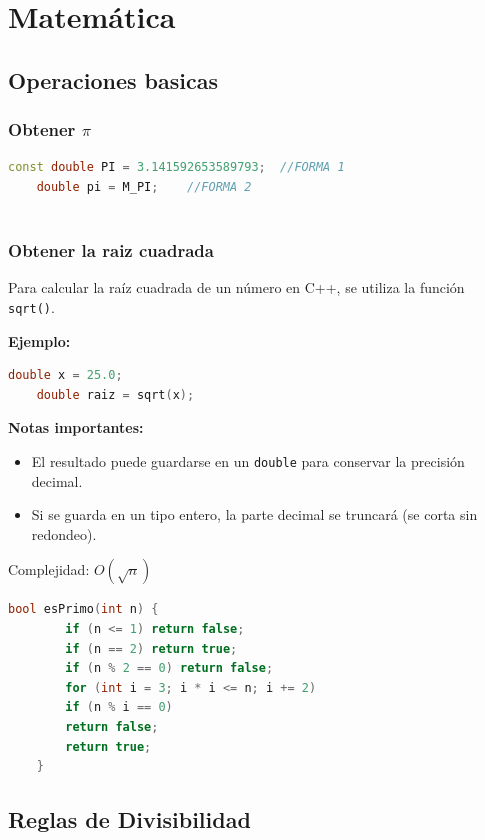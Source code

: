 \chapter{Matemática}

\section{Operaciones basicas}

\subsection{Obtener $\pi$}
\begin{lstlisting}[language=C++, caption={Obtener $\pi$}]
	const double PI = 3.141592653589793;  //FORMA 1
	double pi = M_PI; 	 //FORMA 2
	
\end{lstlisting}

\subsection{Obtener la raiz cuadrada}
Para calcular la raíz cuadrada de un número en C++, se utiliza la función \texttt{sqrt()}.

\bigskip

\textbf{Ejemplo:}

\begin{lstlisting}[language=C++]
	double x = 25.0;
	double raiz = sqrt(x);
\end{lstlisting}

\bigskip

\textbf{Notas importantes:}
\begin{itemize}
	\item El resultado puede guardarse en un \texttt{double} para conservar la precisión decimal.
	\item Si se guarda en un tipo entero, la parte decimal se truncará (se corta sin redondeo).
\end{itemize}

Complejidad: \( O(\sqrt{n}) \)
\begin{lstlisting}[language=C++, caption={Chequear si un número es primo}]
	bool esPrimo(int n) {
		if (n <= 1) return false;
		if (n == 2) return true;
		if (n % 2 == 0) return false;
		for (int i = 3; i * i <= n; i += 2)
		if (n % i == 0)
		return false;
		return true;
	}
\end{lstlisting}

\section{Reglas de Divisibilidad}

